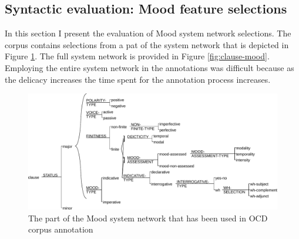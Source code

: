 \subsection{Syntactic evaluation: Mood feature selections}
In this section I present the evaluation of Mood system network selections. The corpus contains selections from a pat of the system network that is depicted in Figure \ref{fig:mood-ocd-simplified}. The full system network is provided in Figure \ref{fig:clause-mood}. Employing the entire system network in the annotations was difficult because as the delicacy increases the time spent for the annotation process increases. 

\begin{figure}[!ht]
    \centering
    \includegraphics[width=.95\textwidth]{Figures/Evaluation/ocd1-mood-simplified.pdf}
    \caption{The part of the Mood system network that has been used in OCD corpus annotation}
    \label{fig:mood-ocd-simplified}
\end{figure}

